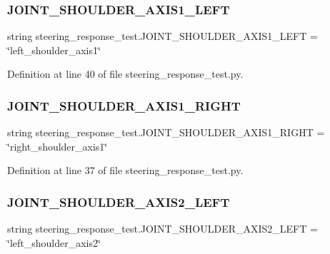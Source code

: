 \subsubsection{\texorpdfstring{JOINT\_SHOULDER\_AXIS1\_LEFT}{JOINT\_SHOULDER\_AXIS1\_LEFT}}
{\footnotesize\ttfamily string steering\+\_\+response\+\_\+test.\+J\+O\+I\+N\+T\+\_\+\+S\+H\+O\+U\+L\+D\+E\+R\+\_\+\+A\+X\+I\+S1\+\_\+\+L\+E\+FT = \char`\"{}left\+\_\+shoulder\+\_\+axis1\char`\"{}}



Definition at line 40 of file steering\+\_\+response\+\_\+test.\+py.

\mbox{\label{namespacesteering__response__test_a4e88b0ab1ec0061733d68683fea270ff}} 
\subsubsection{\texorpdfstring{JOINT\_SHOULDER\_AXIS1\_RIGHT}{JOINT\_SHOULDER\_AXIS1\_RIGHT}}
{\footnotesize\ttfamily string steering\+\_\+response\+\_\+test.\+J\+O\+I\+N\+T\+\_\+\+S\+H\+O\+U\+L\+D\+E\+R\+\_\+\+A\+X\+I\+S1\+\_\+\+R\+I\+G\+HT = \char`\"{}right\+\_\+shoulder\+\_\+axis1\char`\"{}}



Definition at line 37 of file steering\+\_\+response\+\_\+test.\+py.

\mbox{\label{namespacesteering__response__test_a47cc4f7d066ad25bb85f4ed63c793054}} 
\subsubsection{\texorpdfstring{JOINT\_SHOULDER\_AXIS2\_LEFT}{JOINT\_SHOULDER\_AXIS2\_LEFT}}
{\footnotesize\ttfamily string steering\+\_\+response\+\_\+test.\+J\+O\+I\+N\+T\+\_\+\+S\+H\+O\+U\+L\+D\+E\+R\+\_\+\+A\+X\+I\+S2\+\_\+\+L\+E\+FT = \char`\"{}left\+\_\+shoulder\+\_\+axis2\char`\"{}}



